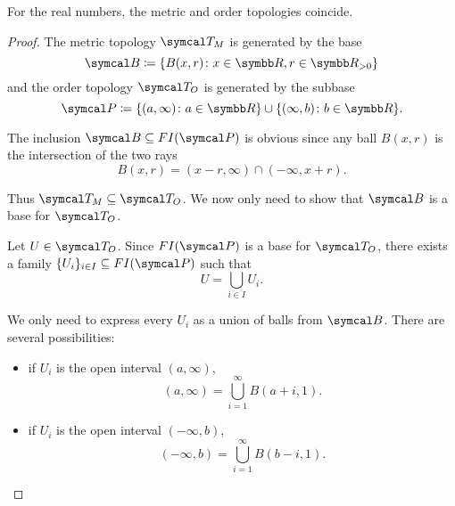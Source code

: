 \begin{theorem}\label{thm:real_metric_and_order_topologies_coincide}
  For the real numbers, the metric and order topologies coincide.
\end{theorem}
\begin{proof}
  The metric topology \( \Cal{T}_M \) is generated by the base
  \begin{equation*}
    \Cal{B} \coloneqq \{ B(x, r) \colon x \in \R, r \in \R_{>0} \}
  \end{equation*}
  and the order topology \( \Cal{T}_O \) is generated by the subbase
  \begin{equation*}
    \Cal{P} \coloneqq \{ (a, \infty) \colon a \in \R \} \cup \{ (\infty, b) \colon b \in \R \}.
  \end{equation*}

  The inclusion \( \Cal{B} \subseteq FI(\Cal{P}) \) is obvious since any ball \( B(x, r) \) is the intersection of the two rays
  \begin{equation*}
    B(x, r) = (x - r, \infty) \cap (-\infty, x + r).
  \end{equation*}

  Thus \( \Cal{T}_M \subseteq \Cal{T}_O \). We now only need to show that \( \Cal{B} \) is a base for \( \Cal{T}_O \).

  Let \( U \in \Cal{T}_O \). Since \( FI(\Cal{P}) \) is a base for \( \Cal{T}_O \), there exists a family \( \{ U_i \}_{i \in I} \subseteq FI(\Cal{P}) \) such that
  \begin{equation*}
    U = \bigcup_{i \in I} U_i.
  \end{equation*}

  We only need to express every \( U_i \) as a union of balls from \( \Cal{B} \). There are several possibilities:
  \begin{itemize}
    \item if \( U_i \) is the open interval \( (a, \infty) \),
    \begin{equation*}
      (a, \infty) = \bigcup_{i=1}^\infty B(a + i, 1).
    \end{equation*}

    \item if \( U_i \) is the open interval \( (-\infty, b) \),
    \begin{equation*}
      (-\infty, b) = \bigcup_{i=1}^\infty B(b - i, 1).
    \end{equation*}


\end{itemize}
\end{proof}
